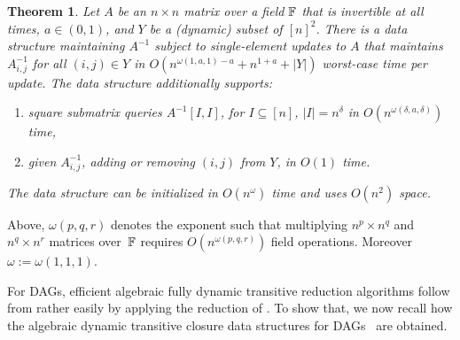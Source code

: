 \documentclass[11pt]{article}
\newtheorem{theorem}{Theorem}[section]
\begin{document}
{\begin{theorem}\label{thm:dyn-inv-elem}{\upshape\cite{Sankowski04, DBLP:conf/cocoon/Sankowski05}}
Let $A$ be an $n\times n$ matrix over a field $\mathbb{F}$ that is invertible at all times, $a\in (0,1)$, and $Y$ be a (dynamic) subset
    of $[n]^2$.
    There is a data structure maintaining $A^{-1}$ subject to \emph{single-element}
    updates to $A$ that maintains $A^{-1}_{i,j}$ for all $(i,j)\in Y$
    in $O(n^{\omega(1,a,1)-a}+n^{1+a}+|Y|)$ worst-case time per update. The data structure additionally supports:
    \begin{enumerate}
        \item square submatrix queries $A^{-1}[I,I]$, for $I\subseteq [n]$, $|I|=n^{\delta}$ in $O(n^{\omega(\delta,a,\delta)})$ time,
        \item given $A^{-1}_{i,j}$, adding or removing $(i,j)$ from $Y$,
        in $O(1)$ time.
    \end{enumerate}
    The data structure can be initialized in $O(n^\omega)$ time and uses $O(n^2)$ space.
\end{theorem}
Above, $\omega(p,q,r)$ denotes the exponent such that multiplying $n^p\times n^q$ and
$n^q\times n^r$ matrices over~$\mathbb{F}$ requires $O(n^{\omega(p,q,r)})$ field operations.
Moreover $\omega:=\omega(1,1,1)$.

For DAGs, efficient algebraic fully dynamic transitive reduction algorithms follow from  rather easily by applying the reduction of . 
To show that, we now recall how the 
algebraic dynamic transitive closure data structures for DAGs~\cite{DemetrescuI05, DBLP:journals/jcss/KingS02}
are obtained.

}
\end{document}
